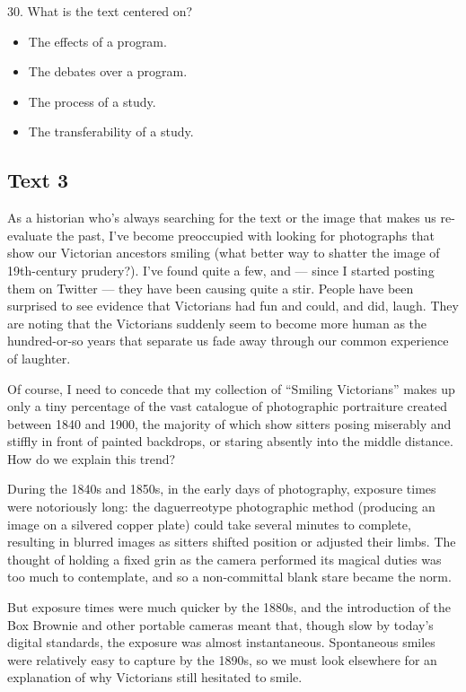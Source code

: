 \documentclass[UTF8,11pt]{ctexart}
\begin{document}
30. What is the text centered on?


\begin{itemize}[leftmargin=2em,itemsep=.2em,topsep=.4em]\item[A.] The effects of a program.
\item[B.] The debates over a program.
\item[C.] The process of a study.
\item[D.] The transferability of a study.
\end{itemize}

\subsection*{\textbf{Text 3}}


As a historian who’s always searching for the text or the image that makes us re-evaluate the past, I’ve become preoccupied with looking for photographs that show our Victorian ancestors smiling (what better way to shatter the image of 19th-century prudery?). I’ve found quite a few, and — since I started posting them on Twitter — they have been causing quite a stir. People have been surprised to see evidence that Victorians had fun and could, and did, laugh. They are noting that the Victorians suddenly seem to become more human as the hundred-or-so years that separate us fade away through our common experience of laughter.


Of course, I need to concede that my collection of “Smiling Victorians” makes up only a tiny percentage of the vast catalogue of photographic portraiture created between 1840 and 1900, the majority of which show sitters posing miserably and stiffly in front of painted backdrops, or staring absently into the middle distance. How do we explain this trend?


During the 1840s and 1850s, in the early days of photography, exposure times were notoriously long: the daguerreotype photographic method (producing an image on a silvered copper plate) could take several minutes to complete, resulting in blurred images as sitters shifted position or adjusted their limbs. The thought of holding a fixed grin as the camera performed its magical duties was too much to contemplate, and so a non-committal blank stare became the norm.


But exposure times were much quicker by the 1880s, and the introduction of the Box Brownie and other portable cameras meant that, though slow by today’s digital standards, the exposure was almost instantaneous. Spontaneous smiles were relatively easy to capture by the 1890s, so we must look elsewhere for an explanation of why Victorians still hesitated to smile.
\end{document}
